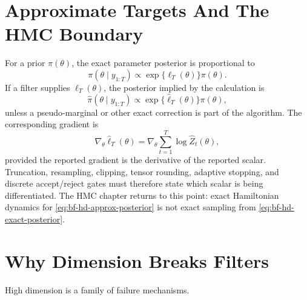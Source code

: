 \section{Approximate Targets And The HMC Boundary}
\label{sec:bf-hd-approx-target}

For a prior $\pi(\theta)$, the exact parameter posterior is proportional to
\begin{equation}
  \pi(\theta\mid y_{1:T})
  \propto \exp\{\ell_T(\theta)\}\pi(\theta).
  \label{eq:bf-hd-exact-posterior}
\end{equation}
If a filter supplies $\widehat\ell_T(\theta)$, the posterior implied by the
calculation is
\begin{equation}
  \widehat\pi(\theta\mid y_{1:T})
  \propto \exp\{\widehat\ell_T(\theta)\}\pi(\theta),
  \label{eq:bf-hd-approx-posterior}
\end{equation}
unless a pseudo-marginal or other exact correction is part of the algorithm.
The corresponding gradient is
\[
  \nabla_\theta \widehat\ell_T(\theta)
  =
  \nabla_\theta\sum_{t=1}^T\log\widehat Z_t(\theta),
\]
provided the reported gradient is the derivative of the reported scalar.
Truncation, resampling, clipping, tensor rounding, adaptive stopping, and
discrete accept/reject gates must therefore state which scalar is being
differentiated.  The HMC chapter returns to this point: exact Hamiltonian
dynamics for \eqref{eq:bf-hd-approx-posterior} is not exact sampling from
\eqref{eq:bf-hd-exact-posterior}.

\section{Why Dimension Breaks Filters}
\label{sec:bf-hd-failure-modes}

High dimension is a family of failure mechanisms.

